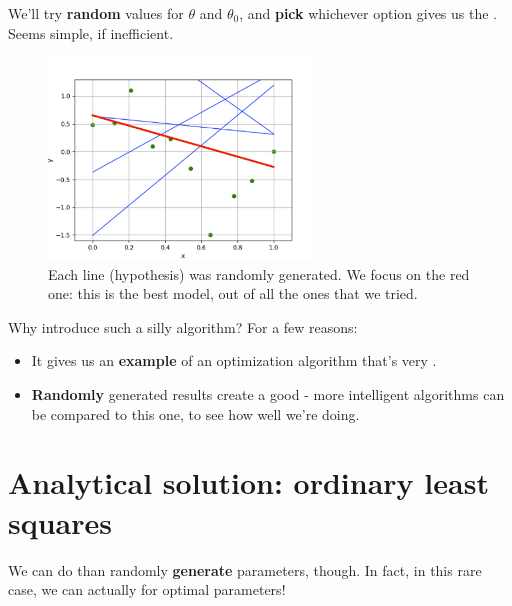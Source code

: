     We'll try \textbf{random} values for $\theta$ and $\theta_0$, and \textbf{pick} whichever option gives us the . Seems simple, if inefficient.

    \begin{figure}[H]
        \centering
            \includegraphics[width=70mm,scale=0.5]{images/regression_images/random_slopes.png}
        
            \caption*{Each line (hypothesis) was randomly generated. We focus on the red one: this is the best model, out of all the ones that we tried.}
        \end{figure}
    
    Why introduce such a silly algorithm? For a few reasons:
    
    \begin{itemize}
        \item It gives us an \textbf{example} of an optimization algorithm that's very .
        \item \textbf{Randomly} generated results create a good  - more intelligent algorithms can be compared to this one, to see how well we're doing.
    \end{itemize}
    

\pagebreak

\section{Analytical solution: ordinary least squares}

    We can do  than randomly \textbf{generate} parameters, though. In fact, in this rare case, we can actually  for optimal parameters!

